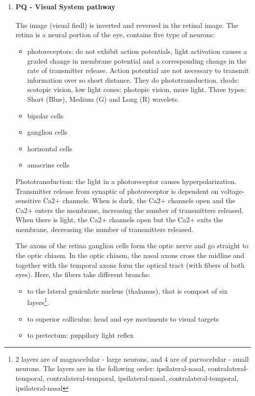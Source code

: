\documentclass[12pt,article,oneside,a4paper]{memoir}
\begin{document}
\begin{enumerate}
\item \paragraph{PQ - Visual System pathway}

The image (visual fiedl) is inverted and reversed in the retinal image. The retina is a neural portion of the eye, contains five type of neurons:
\begin{itemize}
\item photoreceptors: do not exhibit action potentials, light activation causes a graded change in membrane potential and a corresponding change in the rate of transmitter release. Action potential are not necessary to transmit information over so short distance. They do phototransduction.
\subitem rhods: scotopic vision, low light
\subitem cones: photopic vision, more light. Three types: Short (Blue), Medium (G) and Long (R) wavelets.
\item bipolar cells
\item ganglion cells
\item horizontal cells
\item amacrine cells
\end{itemize} 

Phototransduction: the light in a photoreceptor causes hyperpolarization. Transmitter release from synaptic of photoreceptor is dependent on voltage-sensitive Ca2+ channels. When is dark, the Ca2+ channels open and the Ca2+ enters the membrane, increasing the number of transmitters released. When there is light, the Ca2+ channels open but the Ca2+ exits the membrane, decreasing the number of transmitters released.

The axons of the retina ganglion cells form the optic nerve and go straight to the optic chiasm. In the optic chiasm, the nasal axons cross the midline and together with the temporal axons form the optical tract (with fibers of both eyes). Here, the fibers take different branchs:
\begin{itemize}
\item to the lateral geniculate nucleus (thalamus), that is compost of six layers\footnote{2 layers are of magnocelular - large neurons, and 4 are of parvocelular - small neurons. The layers are in the following order: ipsilateral-nasal, contralateral-temporal, contralateral-temporal, ipsilateral-nasal, contralateral-temporal, ipsilateral-nasal}.
\item to superior colliculus: head and eye moviments to visual targets
\item to pretectum: puppilary light reflex
\end{itemize}


\end{enumerate}
\end{document}
